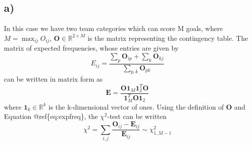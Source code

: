 \documentclass[
]{article}
\newenvironment{Shaded}{\begin{snugshade}}{\end{snugshade}}
\newcommand{\CommentTok}[1]{\textcolor[rgb]{0.56,0.35,0.01}{\textit{#1}}}
\begin{document}
\hypertarget{a-1}{%
\subsection{a)}\label{a-1}}

In this case we have two team categories which can score M goals, where \(M = \max_{ij}{O_{ij}}\), \(\mathbf{O} \in \mathbb{R}^{2\times M}\) is the matrix representing the contingency table. The matrix of expected frequencies, whose entries are given by
\begin{equation*}
  E_{ij} = \frac{\sum_p{\mathbf{O}_{ip}} + \sum_k{\mathbf{O}_{kj}}}{\sum_{p, k}{\mathbf{O}_{pk}}}
\end{equation*}
can be written in matrix form as
\begin{equation}
  \mathbf{E} = \frac{\mathbf{O}\bm{1}_M\bm{1}_2^T\mathbf{O}}{\bm{1}^T_M\mathbf{O}\bm{1}_2}
  \label{eq:expfreq}
\end{equation}
where \(\bm{1}_k \in \mathbb{R}^k\) is the k-dimensional vector of ones. Using the definition of \(\mathbf{O}\) and Equation @ref\{eq:expfreq\}, the \(\chi^2\)-test can be written
\begin{equation}
  \chi^2 = \sum_{i, j}{\frac{\mathbf{O}_{ij} - \mathbf{E}_{ij}}{\mathbf{E}_{ij}}} \sim \chi^2_{1, M-1}
\end{equation}

\begin{Shaded}
\end{Shaded}
\end{document}
